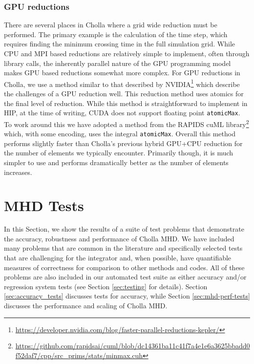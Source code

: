 \documentclass[modern, linenumbers]{aastex631}
\begin{document}
\subsubsection{GPU reductions}

There are several places in Cholla where a grid wide reduction must be performed. The primary example is the calculation of the time step, which requires finding the minimum crossing time in the full simulation grid. While CPU and MPI based reductions are relatively simple to implement, often through library calls, the inherently parallel nature of the GPU programming model makes GPU based reductions somewhat more complex. For GPU reductions in Cholla, we use a method similar to that described by NVIDIA\footnote{\url{https://developer.nvidia.com/blog/faster-parallel-reductions-kepler/}} which describe the challenges of a GPU reduction well. This reduction method uses atomics for the final level of reduction. While this method is straightforward to implement in HIP, at the time of writing, CUDA does not support floating point \texttt{atomicMax}. To work around this we have adopted a method from the RAPIDS cuML library\footnote{\url{https://github.com/rapidsai/cuml/blob/dc14361ba11c41f7a4e1e6a3625bbadd0f52daf7/cpp/src\_prims/stats/minmax.cuh}} which, with some encoding, uses the integral \texttt{atomicMax}. Overall this method performs slightly faster than Cholla's previous hybrid GPU+CPU reduction for the number of elements we typically encounter. Primarily though, it is much simpler to use and performs dramatically better as the number of elements increases.


\section{MHD Tests}
\label{sec:mhd-tests}

In this Section, we show the results of a suite of test problems that demonstrate the accuracy, robustness and performance of Cholla MHD. We have included many problems that are common in the literature and specifically selected tests that are challenging for the integrator and, when possible, have quantifiable measures of correctness for comparison to other methods and codes. All of these problems are also included in our automated test suite as either accuracy and/or regression system tests (see Section \ref{sec:testing} for details). Section \ref{sec:accuracy_tests} discusses tests for accuracy, while Section \ref{sec:mhd-perf-tests} discusses the performance and scaling of Cholla MHD.
\end{document}
